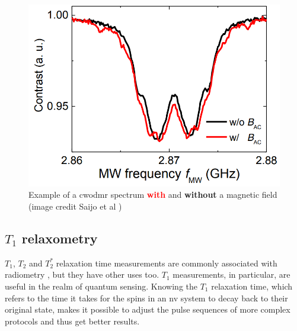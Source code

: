 \begin{figure}[ht]
	\centering
	\includegraphics[width=0.7\linewidth]{img/cw_odmr}
	\caption{Example of a \gls{cwodmr} spectrum \textbf{\textcolor{red}{with}} and \textbf{without} a magnetic field (image credit Saijo et al \cite{saijo2018ac})}
	\label{fig:cwodmr}
\end{figure}


\subsection{$T_1$ relaxometry}
$T_1$, $T_2$ and $T_2^*$ relaxation time measurements are commonly associated with radiometry \cite{ballinger23}, but they have other uses too. $T_1$ measurements, in particular, are useful in the realm of quantum sensing. Knowing the $T_1$ relaxation time, which refers to the time it takes for the spins in an \gls{nv} system to decay back to their original state, makes it possible to adjust the pulse sequences of more complex protocols and thus get better results.  %



